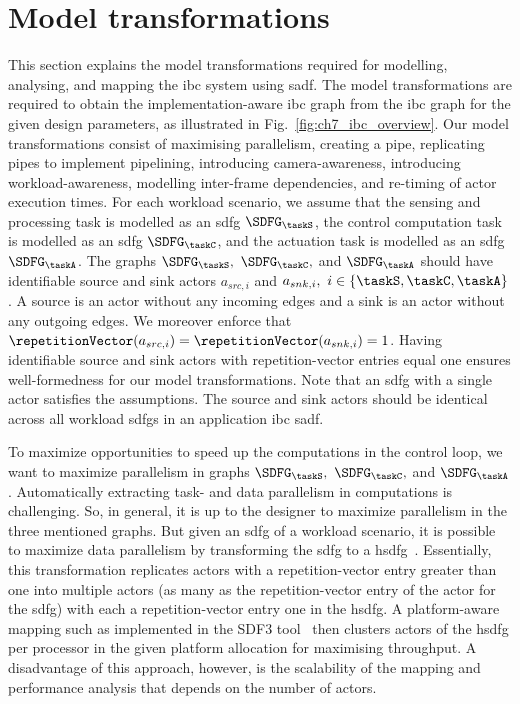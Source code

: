 \section{Model transformations}
\label{sec:ch7_ModelTransformations}
This section explains the model transformations required for modelling, analysing, and mapping the \gls{ibc} system using \gls{sadf}. 
The model transformations are required to obtain the implementation-aware \gls{ibc} graph from the \gls{ibc} graph for the given design parameters, as illustrated in Fig.~\ref{fig:ch7_ibc_overview}.  
Our model transformations consist of maximising parallelism, creating a pipe, replicating pipes to implement pipelining, introducing camera-awareness, introducing workload-awareness, modelling inter-frame dependencies, and re-timing of actor execution times.
For each workload scenario, we assume that the sensing and processing task is modelled as an \gls{sdfg} $\SDFG_{\taskS}$, the control computation task is modelled as an \gls{sdfg} $\SDFG_{\taskC}$, and the actuation task is modelled as an \gls{sdfg} $\SDFG_{\taskA}$.
The graphs $\SDFG_{\taskS},\ \SDFG_{\taskC},$ and $\SDFG_{\taskA}$ should have identifiable source and sink actors $a_{src,i}$ and $a_{snk,i},\ i\in\{\taskS,\taskC,\taskA\}$.
A source is an actor without any incoming edges and a sink is an actor without any outgoing edges.
We moreover enforce that $\repetitionVector(a_{src,i})=%
\repetitionVector(a_{snk,i})=1$. 
Having identifiable source and sink actors with repetition-vector entries equal one ensures well-formedness for our model transformations.
Note that an \gls{sdfg} with a single actor satisfies the assumptions. The source and sink actors should be identical across all workload \glspl{sdfg} in an application \gls{ibc} \gls{sadf}.

To maximize opportunities to speed up the computations in the control loop, we want to maximize parallelism in graphs $\SDFG_{\taskS},\ \SDFG_{\taskC},$ and $\SDFG_{\taskA}$. Automatically extracting task- and data parallelism in computations is challenging. So, in general, it is up to the designer to maximize parallelism in the three mentioned graphs. But given an \gls{sdfg} of a workload scenario, it is possible to maximize data parallelism by transforming the \gls{sdfg} to a \gls{hsdfg}~\cite{lee1987synchronous,sriram2018embedded}. Essentially, this transformation replicates actors with a repetition-vector entry greater than one into multiple actors (as many as the repetition-vector entry of the actor for the \gls{sdfg}) with each a repetition-vector entry one in the \gls{hsdfg}. A platform-aware mapping such as implemented in the SDF3 tool~\cite{stuijk2006sdf} then clusters actors of the \gls{hsdfg} per processor in the given platform allocation for maximising throughput.
A disadvantage of this approach, however, is the scalability of the mapping and performance analysis that depends on the number of actors.

